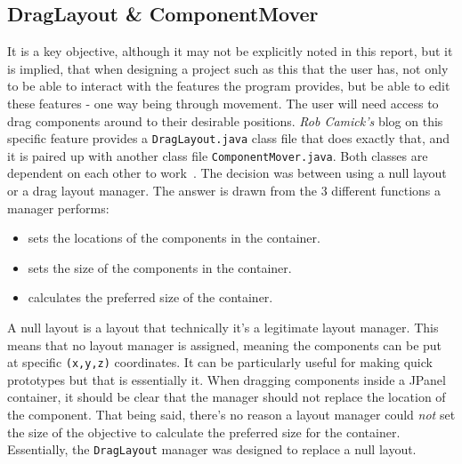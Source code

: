 \documentclass[a4paper, 12pt]{article}
\begin{document}
        \subsection{DragLayout \& ComponentMover}
            It is a key objective, although it may not be explicitly noted in this report, but
            it is implied, that when designing a project such as this that the user has, not only
            to be able to interact with the features the program provides, but be able to edit these
            features - one way being through movement. The user will need access to drag
            components around to their desirable positions. \textit{Rob Camick's} blog on this specific
            feature provides a \texttt{DragLayout.java} class file that does exactly that, and it is
            paired up with another class file \texttt{ComponentMover.java}. Both classes are dependent
            on each other to work~\cite{dragLayout}. The decision was between using a null layout or a drag layout manager.
            The answer is drawn from the 3 different functions a manager performs:

            \begin{itemize}
                \item sets the locations of the components in the container.
                \item sets the size of the components in the container.
                \item calculates the preferred size of the container.
            \end{itemize}

            A null layout is a layout that technically it's a legitimate layout manager. This means that
            no layout manager is assigned, meaning the components can be put at specific \texttt{(x,y,z)}
            coordinates. It can be particularly useful for making quick prototypes but that is essentially it.
            When dragging components inside a JPanel container, it should be clear that the manager
            should not replace the location of the component. That being said, there's no reason a layout
            manager could \textit{not} set the size of the objective to calculate the preferred size
            for the container. Essentially, the \texttt{DragLayout} manager was designed to replace
            a null layout. \\
            
\end{document}
